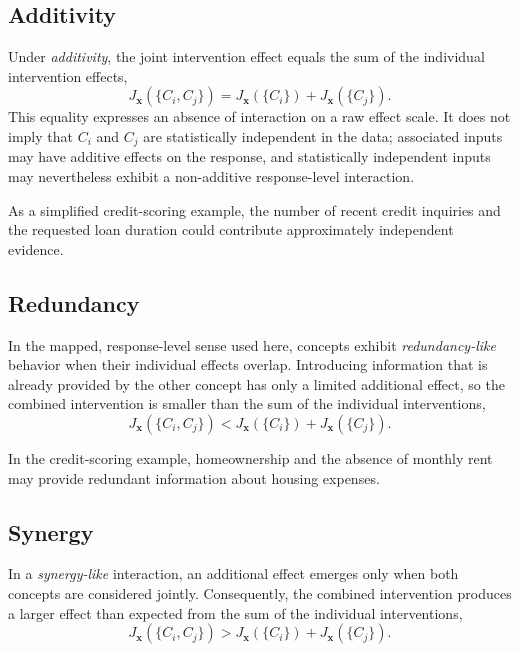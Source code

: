 \subsection{Additivity}
Under \emph{additivity}, the joint intervention effect equals the sum of the individual intervention effects,
\begin{equation}
	J_{\mathbf{x}}(\{C_i,C_j\}) = J_{\mathbf{x}}(\{C_i\})+J_{\mathbf{x}}(\{C_j\}).
\end{equation}
This equality expresses an absence of interaction on a raw effect scale. It does not imply that $C_i$ and $C_j$ are statistically independent in the data; associated inputs may have additive effects on the response, and statistically independent inputs may nevertheless exhibit a non-additive response-level interaction.

As a simplified credit-scoring example, the number of recent credit inquiries and the requested loan duration could contribute approximately independent evidence.

\subsection{Redundancy}
In the mapped, response-level sense used here, concepts exhibit \emph{redundancy-like} behavior when their individual effects overlap. Introducing information that is already provided by the other concept has only a limited additional effect, so the combined intervention is smaller than the sum of the individual interventions,
\begin{equation}
	J_{\mathbf{x}}(\{C_i,C_j\}) < J_{\mathbf{x}}(\{C_i\})+J_{\mathbf{x}}(\{C_j\}).
\end{equation}

In the credit-scoring example, homeownership and the absence of monthly rent may provide redundant information about housing expenses.

\subsection{Synergy}
In a \emph{synergy-like} interaction, an additional effect emerges only when both concepts are considered jointly. Consequently, the combined intervention produces a larger effect than expected from the sum of the individual interventions,
\begin{equation}
	J_{\mathbf{x}}(\{C_i,C_j\}) > J_{\mathbf{x}}(\{C_i\})+J_{\mathbf{x}}(\{C_j\}).
\end{equation}

